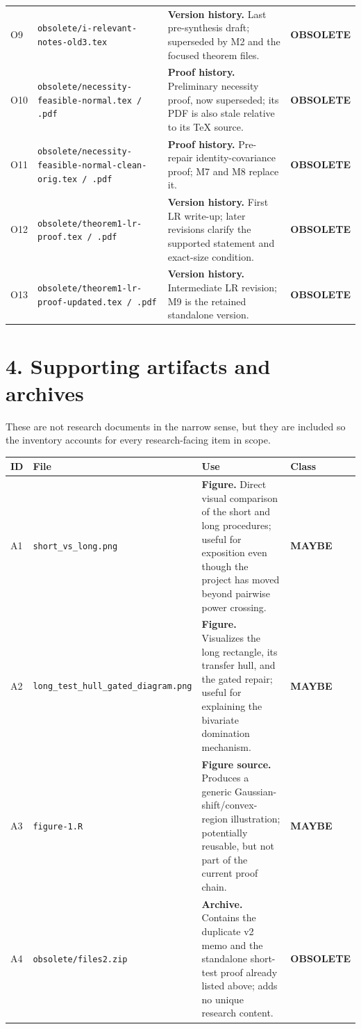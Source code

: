\documentclass[10pt]{article}
\newcommand{\maybe}{\colorbox{maybebg}{\textcolor{maybefg}{\sffamily\bfseries MAYBE}}}
\newcommand{\obsolete}{\colorbox{oldbg}{\textcolor{oldfg}{\sffamily\bfseries OBSOLETE}}}
\newcommand{\fname}[1]{{\footnotesize\nolinkurl{#1}}}
\begin{document}
\begin{longtable}{@{}L{0.035\textwidth}L{0.285\textwidth}L{0.455\textwidth}L{0.125\textwidth}@{}}
O9 & \fname{obsolete/i-relevant-notes-old3.tex} & \textbf{Version history.} Last pre-synthesis draft; superseded by M2 and the focused theorem files. & \obsolete\\[4pt]
O10 & \fname{obsolete/necessity-feasible-normal.tex / .pdf} & \textbf{Proof history.} Preliminary necessity proof, now superseded; its PDF is also stale relative to its TeX source. & \obsolete\\[4pt]
O11 & \fname{obsolete/necessity-feasible-normal-clean-orig.tex / .pdf} & \textbf{Proof history.} Pre-repair identity-covariance proof; M7 and M8 replace it. & \obsolete\\[4pt]
O12 & \fname{obsolete/theorem1-lr-proof.tex / .pdf} & \textbf{Version history.} First LR write-up; later revisions clarify the supported statement and exact-size condition. & \obsolete\\[4pt]
O13 & \fname{obsolete/theorem1-lr-proof-updated.tex / .pdf} & \textbf{Version history.} Intermediate LR revision; M9 is the retained standalone version. & \obsolete\\
\bottomrule
\end{longtable}

\section*{4. Supporting artifacts and archives}

These are not research documents in the narrow sense, but they are included so the inventory accounts for every research-facing item in scope.

\begin{longtable}{@{}L{0.035\textwidth}L{0.27\textwidth}L{0.465\textwidth}L{0.125\textwidth}@{}}
\toprule
\textbf{ID} & \textbf{File} & \textbf{Use} & \textbf{Class}\\
\midrule
\endhead
A1 & \fname{short_vs_long.png} & \textbf{Figure.} Direct visual comparison of the short and long procedures; useful for exposition even though the project has moved beyond pairwise power crossing. & \maybe\\[4pt]
A2 & \fname{long_test_hull_gated_diagram.png} & \textbf{Figure.} Visualizes the long rectangle, its transfer hull, and the gated repair; useful for explaining the bivariate domination mechanism. & \maybe\\[4pt]
A3 & \fname{figure-1.R} & \textbf{Figure source.} Produces a generic Gaussian-shift/convex-region illustration; potentially reusable, but not part of the current proof chain. & \maybe\\[4pt]
A4 & \fname{obsolete/files2.zip} & \textbf{Archive.} Contains the duplicate v2 memo and the standalone short-test proof already listed above; adds no unique research content. & \obsolete\\
\bottomrule
\end{longtable}
\end{document}
